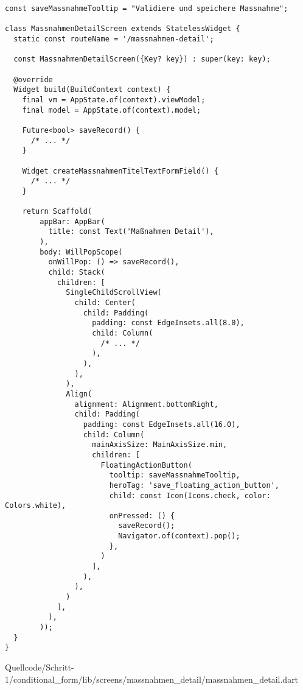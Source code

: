 \ifIncludeFigures
  \begin{listing}[htbp]
    \let\oldtheFancyVerbLine\theFancyVerbLine
  \renewcommand\theFancyVerbLine{%
\ifnum\value{FancyVerbLine}=20 
  \setcounter{FancyVerbLine}{27}%
\else\ifnum\value{FancyVerbLine}=31
  \setcounter{FancyVerbLine}{43}%
\else\ifnum\value{FancyVerbLine}=59
  \setcounter{FancyVerbLine}{75}%
\else
\oldtheFancyVerbLine%
\fi
\fi
\fi
}
    \begin{verbatim}
const saveMassnahmeTooltip = "Validiere und speichere Massnahme";

class MassnahmenDetailScreen extends StatelessWidget {
  static const routeName = '/massnahmen-detail';

  const MassnahmenDetailScreen({Key? key}) : super(key: key);

  @override
  Widget build(BuildContext context) {
    final vm = AppState.of(context).viewModel;
    final model = AppState.of(context).model;

    Future<bool> saveRecord() {
      /* ... */
    }

    Widget createMassnahmenTitelTextFormField() {
      /* ... */
    }

    return Scaffold(
        appBar: AppBar(
          title: const Text('Maßnahmen Detail'),
        ),
        body: WillPopScope(
          onWillPop: () => saveRecord(),
          child: Stack(
            children: [
              SingleChildScrollView(
                child: Center(
                  child: Padding(
                    padding: const EdgeInsets.all(8.0),
                    child: Column(
                      /* ... */
                    ),
                  ),
                ),
              ),
              Align(
                alignment: Alignment.bottomRight,
                child: Padding(
                  padding: const EdgeInsets.all(16.0),
                  child: Column(
                    mainAxisSize: MainAxisSize.min,
                    children: [
                      FloatingActionButton(
                        tooltip: saveMassnahmeTooltip,
                        heroTag: 'save_floating_action_button',
                        child: const Icon(Icons.check, color: Colors.white),
                        onPressed: () {
                          saveRecord();
                          Navigator.of(context).pop();
                        },
                      )
                    ],
                  ),
                ),
              )
            ],
          ),
        ));
  }
}
\end{verbatim}
     {Quellcode/Schritt-1/conditional_form/lib/screens/massnahmen_detail/massnahmen_detail.dart}
    
    \label{lst:Schritt1KlasseMassnahmenDetailScreenStruktur}
  \end{listing}
\fi


